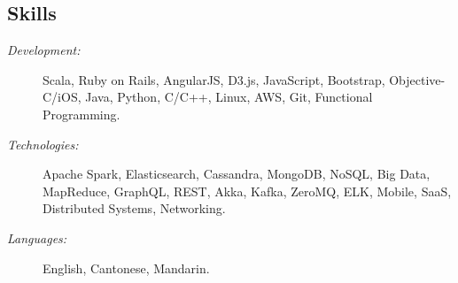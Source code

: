 \documentclass[margin,line]{res}
\newcommand{\sstyle}{\sc}
\begin{document}
\begin{resume}
  \section{\sstyle Skills}
  \begin{description}
  \item[{\it Development:}] Scala, Ruby on Rails, AngularJS, D3.js, JavaScript,
    Bootstrap, Objective-C/iOS, Java, Python, C/C++, Linux, AWS, Git,
    Functional Programming.
  \item[{\it Technologies:}] Apache Spark, Elasticsearch, Cassandra, MongoDB,
    NoSQL, Big Data, MapReduce, GraphQL, REST, Akka, Kafka, ZeroMQ, ELK, Mobile,
    SaaS, Distributed Systems, Networking.
  \item[{\it Languages:}] English, Cantonese, Mandarin.
  \end{description}


\end{resume}
\end{document}
